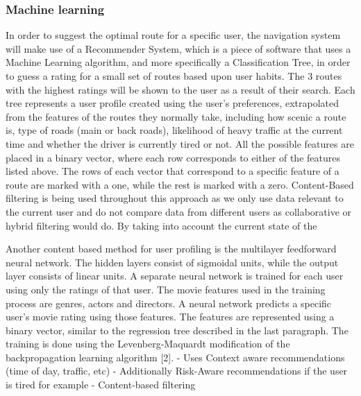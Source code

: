 \documentclass{article}
\begin{document}
\subsubsection{Machine learning}\label{sssec:nav-tech-machinelearning}
In order to suggest the optimal route for a specific user, the navigation system will make use of a Recommender System, which is a piece of software that uses a Machine Learning algorithm, and more specifically a Classification Tree, in order to guess a rating for a small set of routes based upon user habits. The 3 routes with the highest ratings will be shown to the user as a result of their search. Each tree represents a user profile created using the user’s preferences, extrapolated from the features of the routes they normally take, including how scenic a route is, type of roads (main or back roads), likelihood of heavy traffic at the current time and whether the driver is currently tired or not. All the possible features are placed in a binary vector, where each row corresponds to either of the features listed above. The rows of each vector that correspond to a specific feature of a route are marked with a one, while the rest is marked with a zero. Content-Based filtering is being used throughout this approach as we only use data relevant to the current user and do not compare data from different users as collaborative or hybrid filtering would do. By taking into account the current state of the 

Another content based method for user profiling is the multilayer feedforward neural network. The hidden layers consist of sigmoidal units, while the output layer consists of linear units. A separate neural network is trained for each user using only the ratings of that user. The movie features used in the training process are genres, actors and directors. A neural network predicts a specific user’s movie rating using those features. The features are represented using a binary vector, similar to the regression tree described in the last
paragraph. The training is done using the Levenberg-Maquardt modification of the backpropagation learning algorithm [2].
- Uses Context aware recommendations (time of day, traffic, etc)
    - Additionally Risk-Aware recommendations if the user is tired for example
- Content-based filtering
%
%
\end{document}
